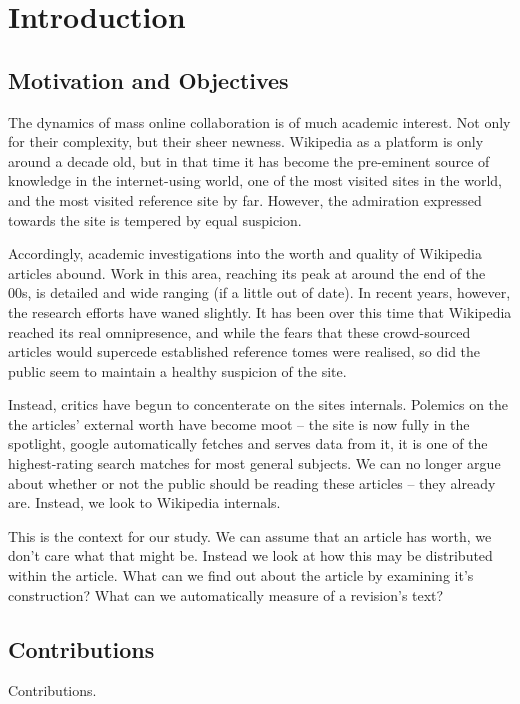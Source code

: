 \chapter{Introduction}

\section{Motivation and Objectives}

The dynamics of mass online collaboration is of much academic
interest. Not only for their complexity, but their sheer
newness. Wikipedia as a platform is only around a decade old, but in
that time it has become the pre-eminent source of knowledge in the
internet-using world, one of the most visited sites in the world, and
the most visited reference site by far. However, the admiration
expressed towards the site is tempered by equal suspicion.

Accordingly, academic investigations into the worth and quality of
Wikipedia articles abound. Work in this area, reaching its peak at
around the end of the 00s, is detailed and wide ranging (if a little
out of date). In recent years, however, the research efforts have
waned slightly. It has been over this time that Wikipedia reached its
real omnipresence, and while the fears that these crowd-sourced
articles would supercede established reference tomes were realised, so
did the public seem to maintain a healthy suspicion of the site.

Instead, critics have begun to concenterate on the sites
internals. Polemics on the the articles' external worth have become
moot -- the site is now fully in the spotlight, google automatically
fetches and serves data from it, it is one of the highest-rating
search matches for most general subjects. We can no longer argue about
whether or not the public should be reading these articles -- they
already are. Instead, we look to Wikipedia internals.

This is the context for our study. We can assume that an article has
worth, we don't care what that might be. Instead we look at how this
may be distributed within the article. What can we find out about the
article by examining it's construction? What can we automatically
measure of a revision's text?

\section{Contributions}

Contributions.


